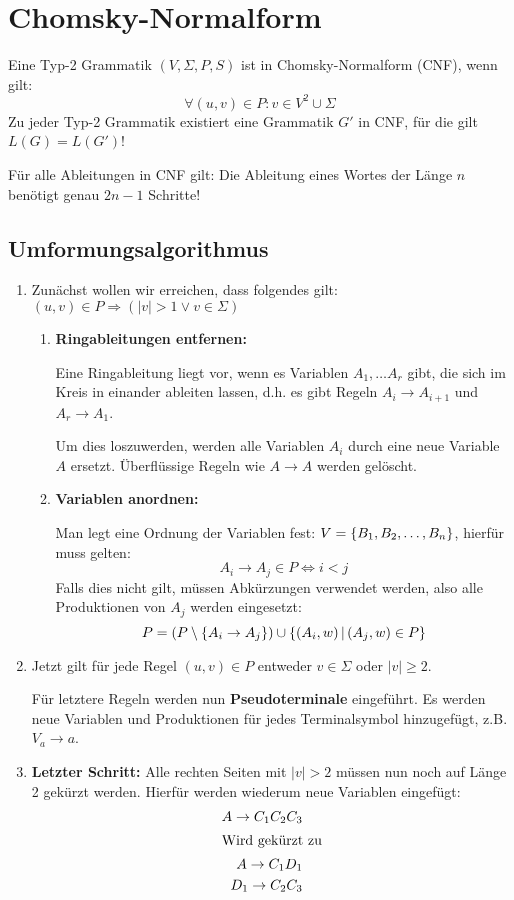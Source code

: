 \section{Chomsky-Normalform}
Eine Typ-2 Grammatik $(V,\Sigma,P,S)$ ist in Chomsky-Normalform (CNF),  wenn gilt:
\begin{equation*}
	\forall (u,v)\in P: v\in V^2\cup \Sigma
\end{equation*}
Zu jeder Typ-2 Grammatik existiert eine Grammatik $G'$ in CNF, für die gilt $L(G)=L(G')$!

Für alle Ableitungen in CNF gilt: Die Ableitung eines Wortes der Länge $n$ benötigt genau $2n-1$ Schritte!
\subsection{Umformungsalgorithmus}\label{cnf:algorithmus}
\begin{enumerate}
	\item Zunächst wollen wir erreichen, dass folgendes gilt: $(u,v)\in P\Rightarrow (|v|>1 \vee v\in \Sigma)$
	\begin{enumerate}
		\item \textbf{Ringableitungen entfernen:}

		Eine Ringableitung liegt vor, wenn es Variablen $A_1,\ldots A_r$ gibt, die sich im Kreis in einander ableiten lassen, d.h. es gibt Regeln $A_i\rightarrow A_{i+1}$ und $A_r\rightarrow A_1$.

		Um dies loszuwerden, werden alle Variablen $A_i$ durch eine neue Variable $A$ ersetzt. Überflüssige Regeln wie $A\rightarrow A$ werden gelöscht.
		\item \textbf{Variablen anordnen:}

		Man legt eine Ordnung der Variablen fest: $V=\left\{ B_1, B_2, \ldots, B_n \right\}$, hierfür muss gelten:
		\begin{equation*}
			A_i\rightarrow A_j \in P \Leftrightarrow i<j
		\end{equation*}
		Falls dies nicht gilt, müssen Abkürzungen verwendet werden, also alle Produktionen von $A_j$ werden eingesetzt:
		\begin{equation*}
			P=(P\setminus\left\{ A_i\rightarrow A_j \right\})\cup\left\{ (A_i,w) \,\middle|\, (A_j,w)\in P \right\}
		\end{equation*}
	\end{enumerate}
	\item Jetzt gilt für jede Regel $(u,v)\in P$ entweder $v\in\Sigma$ oder $|v|\geq 2$.

	Für letztere Regeln werden nun \textbf{Pseudoterminale} eingeführt. Es werden neue Variablen und Produktionen für jedes Terminalsymbol hinzugefügt, z.B. $V_a\rightarrow a$.

	\item \textbf{Letzter Schritt:} Alle rechten Seiten mit $|v|>2$ müssen nun noch auf Länge 2 gekürzt werden. Hierfür werden wiederum neue Variablen eingefügt:%
	\begin{align*}
		A\rightarrow C_1C_2C_3\\
		\intertext{Wird gekürzt zu}
		A\rightarrow C_1D_1\\
		D_1\rightarrow C_2C_3
	\end{align*}
\end{enumerate}

